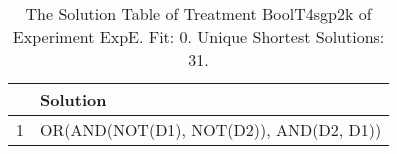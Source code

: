 \begin{table}[ht]
\centering
\begin{tabular}{rp{9cm}}
  \hline
 & Solution \\ 
  \hline
1 & OR(AND(NOT(D1), NOT(D2)), AND(D2, D1)) \\ 
   \hline
\end{tabular}
\caption{The Solution Table of Treatment BoolT4sgp2k of Experiment ExpE. Fit: 0. Unique Shortest Solutions: 31.} 
\end{table}
